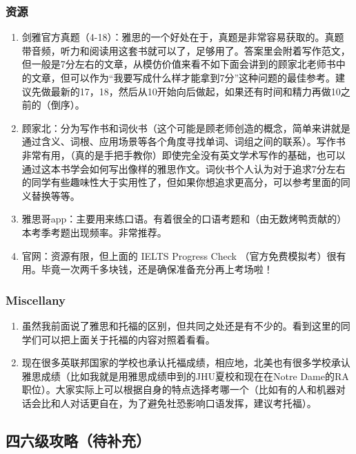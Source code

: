 \documentclass[zihao=-4,fontset=none]{Beautybook-CN}
\begin{document}
\subsubsection{资源}
\begin{enumerate}
\item 剑雅官方真题（4-18）：雅思的一个好处在于，真题是非常容易获取的。真题带音频，听力和阅读用这套书就可以了，足够用了。答案里会附着写作范文，但一般是7分左右的文章，从模仿价值来看不如下面会讲到的顾家北老师书中的文章，但可以作为“我要写成什么样才能拿到7分”这种问题的最佳参考。建议先做最新的17，18，然后从10开始向后做起，如果还有时间和精力再做10之前的（倒序）。
\item 顾家北：分为写作书和词伙书（这个可能是顾老师创造的概念，简单来讲就是通过含义、词根、应用场景等各个角度寻找单词、词组之间的联系）。写作书非常有用，（真的是手把手教你）即使完全没有英文学术写作的基础，也可以通过这本书学会如何写出像样的雅思作文。词伙书个人认为对于追求7分左右的同学有些趣味性大于实用性了，但如果你想追求更高分，可以参考里面的同义替换等等。
\item 雅思哥app：主要用来练口语。有着很全的口语考题和（由无数烤鸭贡献的）本考季考题出现频率。非常推荐。
\item 官网：资源有限，但上面的 IELTS Progress Check （官方免费模拟考）很有用。毕竟一次两千多块钱，还是确保准备充分再上考场啦！
\end{enumerate}
\subsubsection{Miscellany}
\begin{enumerate}
\item 虽然我前面说了雅思和托福的区别，但共同之处还是有不少的。看到这里的同学们可以把上面关于托福的内容对照着看看。
\item 现在很多英联邦国家的学校也承认托福成绩，相应地，北美也有很多学校承认雅思成绩（比如我就是用雅思成绩申到的JHU夏校和现在在Notre Dame的RA职位）。大家实际上可以根据自身的特点选择考哪一个（比如有的人和机器对话会比和人对话更自在，为了避免社恐影响口语发挥，建议考托福）。
\end{enumerate}
\subsection{四六级攻略（待补充）}
\end{document}
